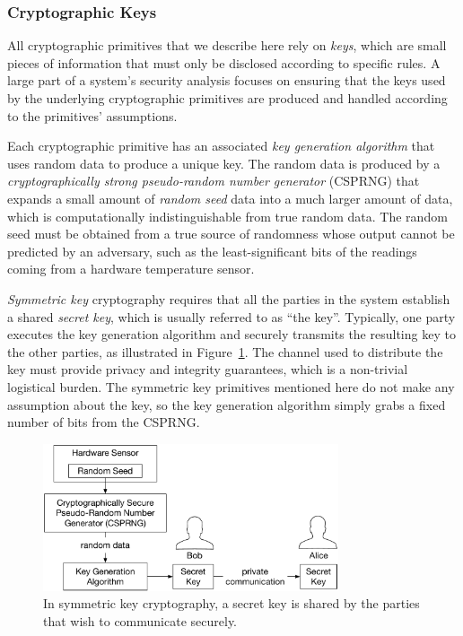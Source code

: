 \subsubsection{Cryptographic Keys}

All cryptographic primitives that we describe here rely on \textit{keys}, which
are small pieces of information that must only be disclosed according to
specific rules. A large part of a system's security analysis focuses on
ensuring that the keys used by the underlying cryptographic primitives are
produced and handled according to the primitives' assumptions.

Each cryptographic primitive has an associated \textit{key generation
algorithm} that uses random data to produce a unique key. The random data is
produced by a \textit{cryptographically strong pseudo-random number generator}
(CSPRNG) that expands a small amount of \textit{random seed} data into a much
larger amount of data, which is computationally indistinguishable from true
random data. The random seed must be obtained from a true source of randomness
whose output cannot be predicted by an adversary, such as the least-significant
bits of the readings coming from a hardware temperature sensor.

\textit{Symmetric key} cryptography requires that all the parties in the system
establish a shared \textit{secret key}, which is usually referred to as ``the
key''. Typically, one party executes the key generation algorithm and securely
transmits the resulting key to the other parties, as illustrated in
Figure~\ref{fig:symmetric_key_generation}. The channel used to
distribute the key must provide privacy and integrity guarantees, which is a
non-trivial logistical burden. The symmetric key primitives mentioned here do
not make any assumption about the key, so the key generation algorithm simply
grabs a fixed number of bits from the CSPRNG.

\begin{figure}[hbt]
  \centering
  \includegraphics[width=87mm]{figures/symmetric_key_generation.pdf}
  \caption{
    In symmetric key cryptography, a secret key is shared by the parties that
    wish to communicate securely.
  }
  \label{fig:symmetric_key_generation}
\end{figure}


